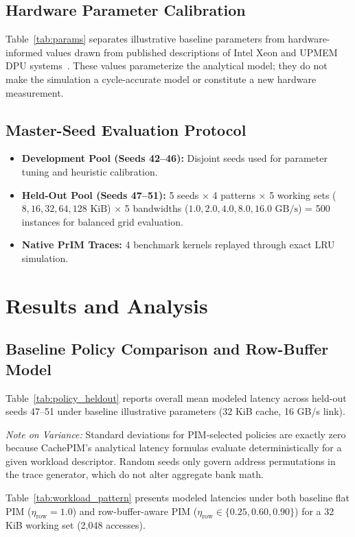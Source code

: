 \documentclass[journal,10pt,twocolumn]{IEEEtran}
\begin{document}
\subsection{Hardware Parameter Calibration}
Table~\ref{tab:params} separates illustrative baseline parameters from hardware-informed values drawn from published descriptions of Intel Xeon and UPMEM DPU systems~\cite{GomezLuna2022}. These values parameterize the analytical model; they do not make the simulation a cycle-accurate model or constitute a new hardware measurement.

\subsection{Master-Seed Evaluation Protocol}
\begin{itemize}
    \item \textbf{Development Pool (Seeds 42--46):} Disjoint seeds used for parameter tuning and heuristic calibration.
    \item \textbf{Held-Out Pool (Seeds 47--51):} 5 seeds $\times$ 4 patterns $\times$ 5 working sets ($8, 16, 32, 64, 128\text{ KiB}$) $\times$ 5 bandwidths ($1.0, 2.0, 4.0, 8.0, 16.0\text{ GB/s}$) = 500 instances for balanced grid evaluation.
    \item \textbf{Native PrIM Traces:} 4 benchmark kernels replayed through exact LRU simulation.
\end{itemize}

\section{Results and Analysis}
\subsection{Baseline Policy Comparison and Row-Buffer Model}
Table~\ref{tab:policy_heldout} reports overall mean modeled latency across held-out seeds 47--51 under baseline illustrative parameters (32 KiB cache, 16 GB/s link).

\textit{Note on Variance:} Standard deviations for PIM-selected policies are exactly zero because CachePIM's analytical latency formulas evaluate deterministically for a given workload descriptor. Random seeds only govern address permutations in the trace generator, which do not alter aggregate bank math.

Table~\ref{tab:workload_pattern} presents modeled latencies under both baseline flat PIM ($\eta_{\text{row}} = 1.0$) and row-buffer-aware PIM ($\eta_{\text{row}} \in \{0.25, 0.60, 0.90\}$) for a 32 KiB working set (2,048 accesses).
\end{document}
